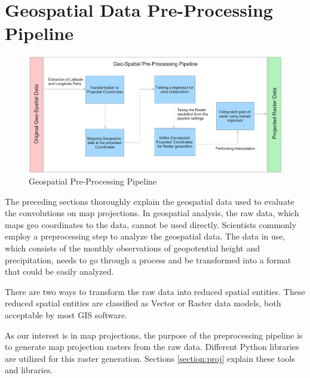 
\clearpage
\cleardoublepage

\chapter{Geospatial Data Pre-Processing Pipeline}
\label{chap:preprocess}
\begin{figure}[h]
    \centering
    \includegraphics[width=1.0\linewidth]{figures/chapter-7/pipeline.png}
    \caption{Geospatial Pre-Processing Pipeline}
    \label{fig:preprocessingpipeline}
\end{figure}
The preceding sections thoroughly explain the geospatial data used to evaluate the convolutions on map projections. In geospatial analysis, the raw data, which maps geo coordinates to the data, cannot be used directly. Scientists commonly employ a preprocessing step to analyze the geospatial data. The data in use, which consists of the monthly observations of geopotential height and precipitation, needs to go through a process and be transformed into a format that could be easily analyzed.

There are two ways to transform the raw data into reduced spatial entities. These reduced spatial entities are classified as Vector or Raster data models, both acceptable by most GIS software.

As our interest is in map projections, the purpose of the preprocessing pipeline is to generate map projection rasters from the raw data. Different Python libraries are utilized for this raster generation.
Sections \autoref{section:proj} explain these tools and libraries.

